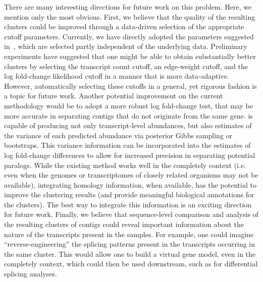 There are many interesting directions for future work on this problem. Here, we mention only the most obvious. First, we believe that the quality of the resulting clusters could be improved through a data-driven selection of the appropriate cutoff parameters.  Currently, we have directly adopted the parameters suggested in~\citep{corset}, which are selected partly independent of the underlying data.  Preliminary experiments have suggested that one might be able to obtain substantially better clusters by selecting the transcript count cutoff, an edge-weight cutoff, and the log fold-change likelihood cutoff in a manner that is more data-adaptive.  However, automatically selecting these cutoffs in a general, yet rigorous fashion is a topic for future work.  Another potential improvement on the current methodology would be to adopt a more robust log fold-change test, that may be more accurate in separating contigs that do not originate from the same gene. \sailfish is capable of producing not only transcript-level abundances, but also estimates of the variance of each predicted abundance via posterior Gibbs sampling or bootstraps.  This variance information can be incorporated into the estimates of log fold-change differences to allow for increased precision in separating potential paralogs. While the existing method works well in the completely \denovo context (i.e. even when the genomes or transcriptomes of closely related organisms may not be available), integrating homology information, when available, has the potential to improve the clustering results (and provide meaningful biological annotations for the clusters). The best way to integrate this information is an exciting direction for future work. Finally, we believe that sequence-level comparison and analysis of the resulting clusters of contigs could reveal important information about the nature of the transcripts present in the samples.  For example, one could imagine ``reverse-engineering'' the splicing patterns present in the transcripts occurring in the same cluster.  This would allow one to build a virtual gene model, even in the completely \denovo context, which could then be used downstream, such as for differential splicing analyses. 